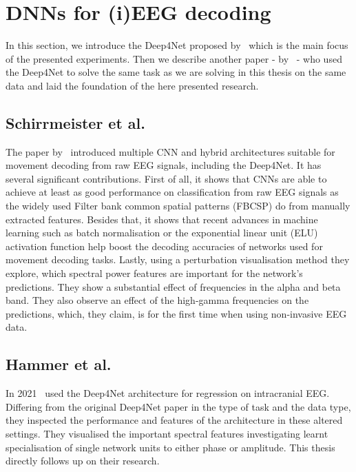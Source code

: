 \section{DNNs for (i)EEG decoding}
\label{sec:dnn-decoding}
In this section, we introduce the Deep4Net proposed by~\cite{schirrmeister-deep-2017} which is the main focus of the presented experiments.
Then we describe another paper - by~\cite{Hammer-2021} - who used the Deep4Net to solve the same task as we are solving in this thesis on the same data and laid the foundation of the here presented research.

\subsection{Schirrmeister et al.}\label{subsec:schirrmeister-et-al}
The paper by~\cite{schirrmeister-deep-2017} introduced multiple CNN and hybrid architectures suitable for movement decoding from raw EEG signals, including the Deep4Net.
It has several significant contributions.
First of all, it shows that CNNs are able to achieve at least as good performance on classification from raw EEG signals as the widely used Filter bank common spatial patterns (FBCSP) do from manually extracted features.
Besides that, it shows that recent advances in machine learning such as batch normalisation or the exponential linear unit (ELU) activation function help boost the decoding accuracies of networks used for movement decoding tasks.
Lastly, using a perturbation visualisation method they explore, which spectral power features are important for the network's predictions.
They show a substantial effect of frequencies in the alpha and beta band. They also observe an effect of the high-gamma frequencies on the predictions, which, they claim, is for the first time when using non-invasive EEG data.


\subsection{Hammer et al.}\label{subsec:hammer-et-al}
In 2021~\cite{Hammer-2021} used the Deep4Net architecture for regression on intracranial EEG.
Differing from the original Deep4Net paper in the type of task and the data type, they inspected the performance and features of the architecture in these altered settings.
They visualised the important spectral features investigating learnt specialisation of single network units to either phase or amplitude.
This thesis directly follows up on their research.

